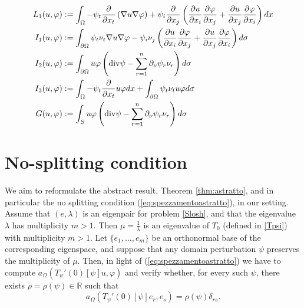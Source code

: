 \documentclass[a4paper,reqno,11pt,oneside]{amsart}
\theoremstyle{plain}
\theoremstyle{plain}
\theoremstyle{plain}
\theoremstyle{remark}
\def\div{\textup{div}}
\begin{document}
$$\begin{aligned}
    L_1(u,\varphi)&:=\int_\Omega-\psi_t \frac{\partial}{\partial x_t} \left(\nabla u\nabla \varphi\right) + \psi_i\frac{\partial }{ \partial x_j}\left(\frac{\partial u}{\partial x_i}\frac{\partial \varphi}{\partial x_j}+
\frac{\partial u}{\partial x_j}\frac{\partial \varphi}{\partial x_i}
\right) dx\\
  I_1(u,\varphi)&:=\int_{\partial\Omega}\psi_t \nu_t \nabla u\nabla \varphi -
\psi_i \nu_j\left(\frac{\partial u}{\partial x_i}\frac{\partial \varphi}{\partial x_j}+\frac{\partial u}{\partial x_j}\frac{\partial \varphi}{\partial x_i}
\right) d\sigma\\
  I_2( u,\varphi)&:=\int_{\partial \Omega} u\varphi \left(\div \psi -\sum_{r=1}^n \partial_\nu \psi_r \nu_r\right) d\sigma\\
   I_3( u,\varphi)&:= 
\int_\Omega-\psi_t \frac{\partial}{\partial x_t}  u \varphi  dx
+\int_{\partial\Omega}\psi_t \nu_t  u \varphi d\sigma
   \\
      G(u,\varphi)&:=\int_{ S} u\varphi \left(\div \psi -\sum_{r=1}^n \partial_\nu \psi_r \nu_r\right) d\sigma
 \end{aligned}$$




\section{No-splitting condition}
\label{nosplitti}
We aim to reformulate the abstract result, 
Theorem \ref{thm:astratto}, and in particular the no splitting condition (\ref{eq:spezzamentoastratto}), in our setting. 
Assume that $(e,\lambda)$  is an eigenpair for problem \eqref{Slosh}, and that the eigenvalue $\lambda$ has multiplicity $m>1$. Then $\mu=\frac1\lambda $ is an eigenvalue of $T_0$ (defined in \ref{Tpsi}) with multiplicity $m>1$. Let $\{e_1, \dots,e_m \}$ be an orthonormal base of the corresponding eigenspace, and suppose that any domain perturbation  $\psi$  preserves the multiplicity of $\mu$. Then, in light of  (\ref{eq:spezzamentoastratto}) we have to compute $   a_\Omega  (T_\psi '(0)[\psi] u,\varphi)$ and verify whether, for every such $\psi$, there exists $\rho=\rho(\psi)\in \mathbb{R}$ such that
$$
       a_\Omega  (T_\psi '(0)[\psi] e_r,e_s)=  \rho(\psi)\delta_{rs}.
$$
\end{document}
